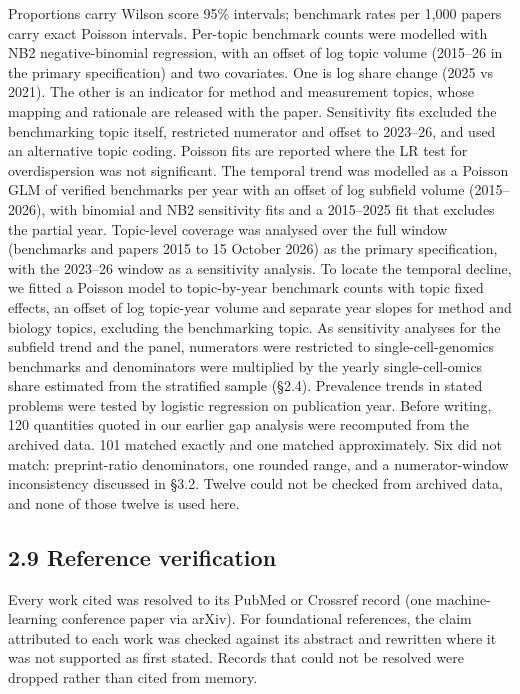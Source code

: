 \documentclass[11pt]{article}
\begin{document}
Proportions carry Wilson score 95\% intervals; benchmark rates per 1,000
papers carry exact Poisson intervals. Per-topic benchmark counts were
modelled with NB2 negative-binomial regression, with an offset of log
topic volume (2015--26 in the primary specification) and two covariates.
One is log share change (2025 vs 2021). The other is an indicator for
method and measurement topics, whose mapping and rationale are released
with the paper. Sensitivity fits excluded the benchmarking topic itself,
restricted numerator and offset to 2023--26, and used an alternative
topic coding. Poisson fits are reported where the LR test for
overdispersion was not significant. The temporal trend was modelled as a
Poisson GLM of verified benchmarks per year with an offset of log
subfield volume (2015--2026), with binomial and NB2 sensitivity fits and
a 2015--2025 fit that excludes the partial year. Topic-level coverage
was analysed over the full window (benchmarks and papers 2015 to 15
October 2026) as the primary specification, with the 2023--26 window as
a sensitivity analysis. To locate the temporal decline, we fitted a
Poisson model to topic-by-year benchmark counts with topic fixed
effects, an offset of log topic-year volume and separate year slopes for
method and biology topics, excluding the benchmarking topic. As
sensitivity analyses for the subfield trend and the panel, numerators
were restricted to single-cell-genomics benchmarks and denominators were
multiplied by the yearly single-cell-omics share estimated from the
stratified sample (§2.4). Prevalence trends in stated problems were
tested by logistic regression on publication year. Before writing, 120
quantities quoted in our earlier gap analysis were recomputed from the
archived data. 101 matched exactly and one matched approximately. Six
did not match: preprint-ratio denominators, one rounded range, and a
numerator-window inconsistency discussed in §3.2. Twelve could not be
checked from archived data, and none of those twelve is used here.

\subsection{2.9 Reference verification}\label{reference-verification}

Every work cited was resolved to its PubMed or Crossref record (one
machine-learning conference paper via arXiv). For foundational
references, the claim attributed to each work was checked against its
abstract and rewritten where it was not supported as first stated.
Records that could not be resolved were dropped rather than cited from
memory.
\end{document}
